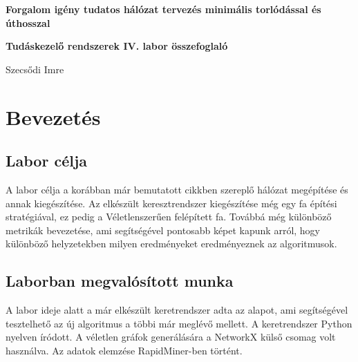 \documentclass[12pt]{report}
\begin{document}
\begin{titlepage}
	\begin{center}
		\vspace*{1cm}
		
		\textbf{\LARGE 
			Forgalom igény tudatos hálózat tervezés minimális torlódással és úthosszal
		}
	
	
		\vspace{0.5cm}
	
		\textbf{\normalsize Tudáskezelő rendszerek IV. labor összefoglaló}
		
		\vfill
		
		\Large Szecsődi Imre
		
		\vspace{2.8cm}
		
		\the\year
		
	\end{center}
\end{titlepage}

\tableofcontents
	
\chapter{Bevezetés}


\section{Labor célja}

A labor célja a korábban már bemutatott cikkben\cite{avin_demand-aware_nodate} szereplő hálózat megépítése és annak kiegészítése.
Az elkészült keresztrendszer kiegészítése még egy fa építési stratégiával, ez pedig a Véletlenszerűen felépített fa.
Továbbá még különböző metrikák bevezetése, ami segítségével pontosabb képet kapunk arról, hogy különböző helyzetekben milyen eredményeket eredményeznek az algoritmusok.


\section{Laborban megvalósított munka}

A labor ideje alatt a már elkészült keretrendszer adta az alapot, ami segítségével tesztelhető az új algoritmus a többi már meglévő mellett.
A keretrendszer Python \cite{noauthor_python_nodate} nyelven íródott.
A véletlen gráfok generálására a NetworkX külső csomag volt használva\cite{noauthor_networkx_nodate}.
Az adatok elemzése RapidMiner-ben történt\cite{noauthor_lightning_nodate}.
\end{document}
